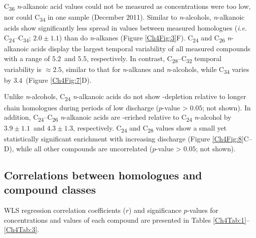 C\textsubscript{36} \textit{n}-alkanoic acid  values could not be measured as concentrations were too low, nor could C\textsubscript{34} in one sample (December 2011). Similar to \textit{n}-alcohols, \textit{n}-alkanoic acids show significantly less spread in  values between measured homologues (\textit{i.e.} C\textsubscript{24}--C\textsubscript{34}; $2.0 \pm 1.1$\textperthousand) than do \textit{n}-alkanes (Figure \ref{Ch4Fig:3}F). C\textsubscript{24} and C\textsubscript{26} \textit{n}-alkanoic acids display the largest temporal variability of all measured compounds with a range of $5.2$\textperthousand\ and $5.5$\textperthousand, respectively. In contrast, C\textsubscript{28}--C\textsubscript{32} temporal variability is $\approx 2.5$\textperthousand, similar to that for \textit{n}-alkanes and \textit{n}-alcohols, while C\textsubscript{34} varies by $3.4$\textperthousand\ (Figure \ref{Ch4Fig:7}D).

Unlike \textit{n}-alcohols, C\textsubscript{24} \textit{n}-alkanoic acids do not show -depletion relative to longer chain homologues during periods of low discharge ($p$-value > $0.05$; not shown). In addition, C\textsubscript{24}--C\textsubscript{26} \textit{n}-alkanoic acids are -eriched relative to C\textsubscript{24} \textit{n}-alcohol by $3.9 \pm 1.1$\textperthousand\ and $4.3 \pm 1.3$\textperthousand, respectively. C\textsubscript{24} and C\textsubscript{28}  values show a small yet statistically significant enrichment with increasing discharge (Figure \ref{Ch4Fig:8}C--D), while all other compounds are uncorrelated ($p$-value > $0.05$; not shown).

\subsection{Correlations between homologues and compound classes}

WLS regression correlation coefficients ($r$) and significance $p$-values for concentrations and  values of each compound are presented in Tables \ref{Ch4Tab:1}--\ref{Ch4Tab:3}. 

